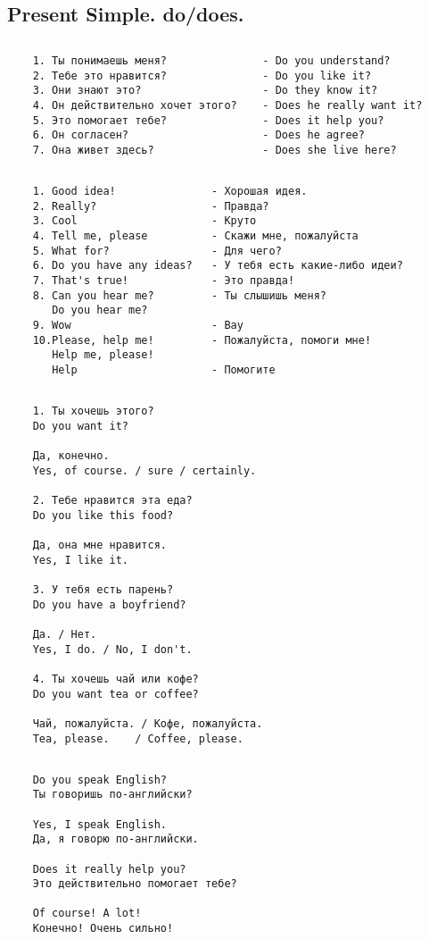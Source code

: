 \subsection{Present Simple. do/does.}
\subsection*{}
\begin{verbatim}
    1. Ты понимаешь меня?               - Do you understand?
    2. Тебе это нравится?               - Do you like it?
    3. Они знают это?                   - Do they know it?
    4. Он действительно хочет этого?    - Does he really want it?
    5. Это помогает тебе?               - Does it help you?
    6. Он согласен?                     - Does he agree?
    7. Она живет здесь?                 - Does she live here?
\end{verbatim}

\subsection*{}
\begin{verbatim}
    1. Good idea!               - Хорошая идея.
    2. Really?                  - Правда?
    3. Cool                     - Круто
    4. Tell me, please          - Скажи мне, пожалуйста
    5. What for?                - Для чего?
    6. Do you have any ideas?   - У тебя есть какие-либо идеи?
    7. That's true!             - Это правда!
    8. Can you hear me?         - Ты слышишь меня?
       Do you hear me?
    9. Wow                      - Вау
    10.Please, help me!         - Пожалуйста, помоги мне!
       Help me, please!
       Help                     - Помогите
\end{verbatim}

\subsection*{}
\begin{verbatim}
    1. Ты хочешь этого?
    Do you want it?

    Да, конечно.
    Yes, of course. / sure / certainly.

    2. Тебе нравится эта еда?
    Do you like this food?

    Да, она мне нравится.
    Yes, I like it.

    3. У тебя есть парень?
    Do you have a boyfriend?

    Да. / Нет.
    Yes, I do. / No, I don't.

    4. Ты хочешь чай или кофе?
    Do you want tea or coffee?

    Чай, пожалуйста. / Кофе, пожалуйста.
    Tea, please.    / Coffee, please.
\end{verbatim}

\subsection*{}
\begin{verbatim}
    Do you speak English?
    Ты говоришь по-английски?

    Yes, I speak English.
    Да, я говорю по-английски.

    Does it really help you?
    Это действительно помогает тебе?

    Of course! A lot!
    Конечно! Очень сильно!
\end{verbatim}
